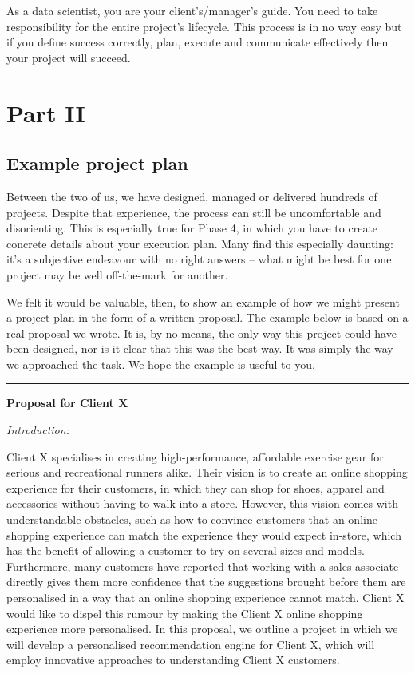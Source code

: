 \documentclass[
]{book}
\begin{document}
As a data scientist, you are your client's/manager's guide. You need to take responsibility for the entire project's lifecycle. This process is in no way easy but if you define success correctly, plan, execute and communicate effectively then your project will succeed.

\hypertarget{part-part-ii}{%
\part*{Part II}\label{part-part-ii}}

\hypertarget{example-project-plan}{%
\chapter{Example project plan}\label{example-project-plan}}

Between the two of us, we have designed, managed or delivered hundreds of projects. Despite that experience, the process can still be uncomfortable and disorienting. This is especially true for Phase 4, in which you have to create concrete details about your execution plan. Many find this especially daunting: it's a subjective endeavour with no right answers -- what might be best for one project may be well off-the-mark for another.

We felt it would be valuable, then, to show an example of how we might present a project plan in the form of a written proposal. The example below is based on a real proposal we wrote. It is, by no means, the only way this project could have been designed, nor is it clear that this was the best way. It was simply the way we approached the task. We hope the example is useful to you.

\begin{center}\rule{0.5\linewidth}{0.5pt}\end{center}

\textbf{Proposal for Client X}

\emph{Introduction:}

Client X specialises in creating high-performance, affordable exercise gear for serious and recreational runners alike. Their vision is to create an online shopping experience for their customers, in which they can shop for shoes, apparel and accessories without having to walk into a store. However, this vision comes with understandable obstacles, such as how to convince customers that an online shopping experience can match the experience they would expect in-store, which has the benefit of allowing a customer to try on several sizes and models. Furthermore, many customers have reported that working with a sales associate directly gives them more confidence that the suggestions brought before them are personalised in a way that an online shopping experience cannot match. Client X would like to dispel this rumour by making the Client X online shopping experience more personalised. In this proposal, we outline a project in which we will develop a personalised recommendation engine for Client X, which will employ innovative approaches to understanding Client X customers.
\end{document}

